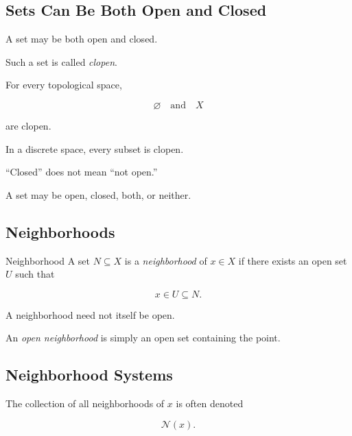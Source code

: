 \subsection{Sets Can Be Both Open and Closed}
\label{subsec:clopen-sets}

A set may be both open and closed.

Such a set is called \emph{clopen}.

For every topological space,

\[
\boxed{
\varnothing
\quad\text{and}\quad
X
}
\]

are clopen.

In a discrete space, every subset is clopen.

\begin{warningbox}
``Closed'' does not mean ``not open.''

A set may be open, closed, both, or neither.
\end{warningbox}

\subsection{Neighborhoods}
\label{subsec:topological-neighborhoods}

\begin{definitionbox}{Neighborhood}
A set \(N\subseteq X\) is a \emph{neighborhood} of \(x\in X\) if there exists
an open set \(U\) such that

\[
\boxed{
x\in U\subseteq N.
}
\]
\end{definitionbox}

A neighborhood need not itself be open.

An \emph{open neighborhood} is simply an open set containing the point.

\subsection{Neighborhood Systems}
\label{subsec:neighborhood-systems}

The collection of all neighborhoods of \(x\) is often denoted

\[
\boxed{
\mathcal{N}(x).
}
\]


